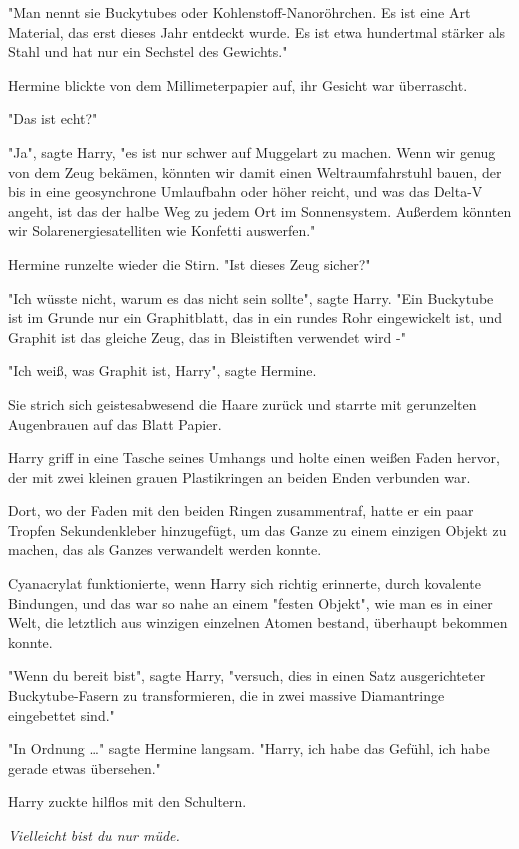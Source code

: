 {"Man nennt sie Buckytubes oder Kohlenstoff-Nanoröhrchen. Es ist eine Art Material, das erst dieses Jahr entdeckt wurde. Es ist etwa hundertmal stärker als Stahl und hat nur ein Sechstel des Gewichts."

Hermine blickte von dem Millimeterpapier auf, ihr Gesicht war überrascht.

"Das ist echt?"

"Ja", sagte Harry, "es ist nur schwer auf Muggelart zu machen. Wenn wir genug von dem Zeug bekämen, könnten wir damit einen Weltraumfahrstuhl bauen, der bis in eine geosynchrone Umlaufbahn oder höher reicht, und was das Delta-V angeht, ist das der halbe Weg zu jedem Ort im Sonnensystem. Außerdem könnten wir Solarenergiesatelliten wie Konfetti auswerfen."

Hermine runzelte wieder die Stirn. "Ist dieses Zeug sicher?"

"Ich wüsste nicht, warum es das nicht sein sollte", sagte Harry. "Ein Buckytube ist im Grunde nur ein Graphitblatt, das in ein rundes Rohr eingewickelt ist, und Graphit ist das gleiche Zeug, das in Bleistiften verwendet wird -"

"Ich weiß, was Graphit ist, Harry", sagte Hermine.

Sie strich sich geistesabwesend die Haare zurück und starrte mit gerunzelten Augenbrauen auf das Blatt Papier.

Harry griff in eine Tasche seines Umhangs und holte einen weißen Faden hervor, der mit zwei kleinen grauen Plastikringen an beiden Enden verbunden war.

Dort, wo der Faden mit den beiden Ringen zusammentraf, hatte er ein paar Tropfen Sekundenkleber hinzugefügt, um das Ganze zu einem einzigen Objekt zu machen, das als Ganzes verwandelt werden konnte.

Cyanacrylat funktionierte, wenn Harry sich richtig erinnerte, durch kovalente Bindungen, und das war so nahe an einem "festen Objekt", wie man es in einer Welt, die letztlich aus winzigen einzelnen Atomen bestand, überhaupt bekommen konnte.

"Wenn du bereit bist", sagte Harry, "versuch, dies in einen Satz ausgerichteter Buckytube-Fasern zu transformieren, die in zwei massive Diamantringe eingebettet sind."

"In Ordnung …" sagte Hermine langsam. "Harry, ich habe das Gefühl, ich habe gerade etwas übersehen."

Harry zuckte hilflos mit den Schultern.

\emph{Vielleicht bist du nur müde.}

}
